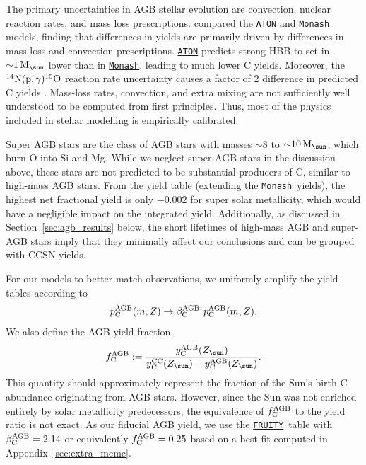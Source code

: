 \documentclass[fleqn,
usenatbib]{mnras}
\newcommand{\fruity}{\texttt{\hyperlink{fruity}{FRUITY}}}
\newcommand{\monash}{\texttt{\hyperlink{monash}{Monash}}}
\newcommand{\aton}{\texttt{\hyperlink{aton}{ATON}}}
\newcommand{\cfactor}{2.14}
\newcommand{\Ycc}{{y_{\rm C}^{\rm CC}}}
\newcommand{\Ycagb}{{y_{\rm C}^{\rm AGB}}}
\newcommand{\ycagb}{\y_{\rm C}^{\rm AGB}}
\newcommand{\y}{p}
\newcommand{\aagb}{\beta_{\rm C}^{\rm AGB}}
\newcommand{\fagb}{f_{\rm C}^{\rm AGB}}
\newcommand{\Mo}{ {\rm M}_{\sun}}
\newcommand{\Zo}{ Z_{\sun}}
\begin{document}


The primary uncertainties in AGB stellar evolution are convection, nuclear reaction rates, and mass loss prescriptions.
\citet{ventura+15} compared the \aton{} and \monash{} models, finding that differences in yields are primarily driven by differences in mass-loss and convection prescriptions. \aton{} predicts strong HBB to set in ${\sim}1\,\Mo$ lower than in \monash{}, leading to much lower C yields.
Moreover, the $^{14}{\rm N}({\rm p},\gamma)^{15}{\rm O}$ reaction rate uncertainty causes a factor of 2 difference in predicted C yields \citep{herwig+austin2004, HAL2006}.
Mass-loss rates, convection, and extra mixing are not sufficiently well understood to be computed from first principles. Thus, most of the physics included in stellar modelling is empirically calibrated. 

Super AGB stars are the class of AGB stars with masses ${\sim}8$ to ${\sim}10\,\Mo$, which burn O into Si and Mg. While we neglect super-AGB stars in the discussion above, these stars are not predicted to be substantial producers of C, similar to high-mass AGB stars. From the \citet{doherty+14, doherty+14b} yield table (extending the \monash\ yields), the highest net fractional yield is only $-0.002$ for super solar metallicity, which would have a negligible impact on the integrated yield. Additionally, as discussed in Section~\ref{sec:agb_results} below, the short lifetimes of high-mass AGB and super-AGB stars imply that they minimally affect our conclusions and can be grouped with CCSN yields.

For our models to better match observations, we uniformly amplify the yield tables according to
\begin{equation} \label{eq:alpha}
        \ycagb(m, Z) \rightarrow \aagb\ \ycagb(m, Z).
\end{equation}
We also define the AGB yield fraction, 
\begin{equation}\label{eq:f_agb}
    \fagb := \frac{\Ycagb(\Zo)}{\Ycc(\Zo) + \Ycagb(\Zo)}.
    \end{equation}
This quantity should approximately represent the fraction of the Sun's birth C abundance originating from AGB stars. However, since the Sun was not enriched entirely by solar metallicity predecessors, the equivalence of $\fagb{}$ to the yield ratio is not exact.
As our fiducial AGB yield, we use the \fruity\ table with $\aagb=\cfactor$ or equivalently $\fagb=0.25$ based on a best-fit computed in Appendix~\ref{sec:extra_mcmc}. 
\end{document}
